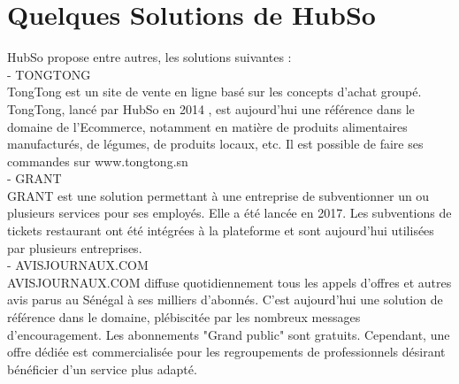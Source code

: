 \section{Quelques Solutions de HubSo }
HubSo propose entre autres, les solutions suivantes : \\
- TONGTONG \\
TongTong est un site de vente en ligne basé sur les concepts d'achat groupé. TongTong, lancé par HubSo en 2014 , est aujourd'hui une référence dans le domaine de l'Ecommerce, notamment en matière de produits alimentaires manufacturés, de légumes, de produits locaux, etc. Il est possible de faire ses commandes sur www.tongtong.sn \\
- GRANT \\
GRANT est une solution permettant à une entreprise de subventionner un ou plusieurs services pour ses employés. Elle a été lancée en 2017. Les subventions de tickets restaurant ont été intégrées à la plateforme et sont aujourd'hui utilisées par plusieurs entreprises.\\
- AVISJOURNAUX.COM \\
AVISJOURNAUX.COM diffuse quotidiennement tous les appels d'offres et autres avis parus au Sénégal à ses milliers d'abonnés. C'est aujourd'hui une solution de référence dans le domaine, plébiscitée par les nombreux messages d'encouragement. Les abonnements "Grand public" sont gratuits. Cependant, une offre dédiée est commercialisée pour les regroupements de professionnels désirant bénéficier d'un service plus adapté. 
